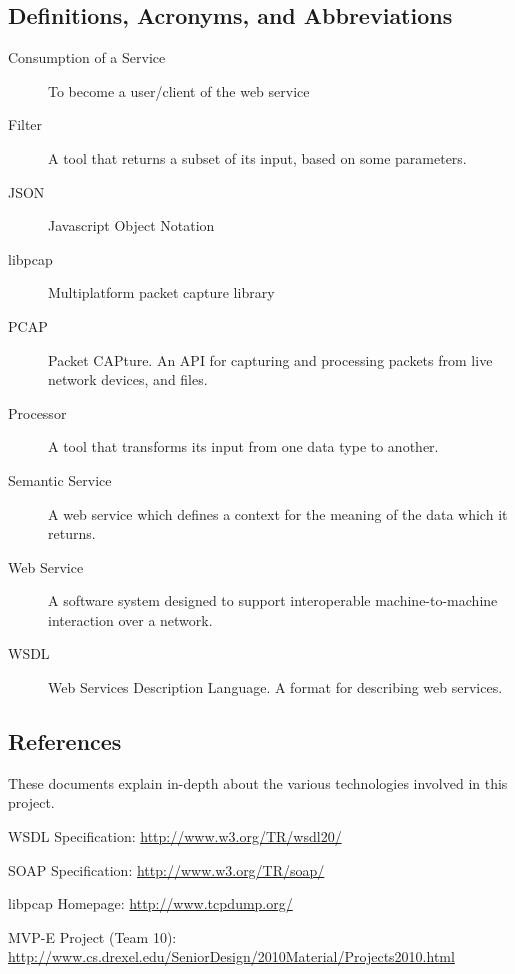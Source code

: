 \documentclass[titlepage]{article}
\begin{document}

\subsection{Definitions, Acronyms, and Abbreviations%
  \label{definitions}%
}

\begin{description}
\item[Consumption of a Service]
    To become a user/client of the web service

\item[Filter]
    A tool that returns a subset of its input, based on some parameters.

\item[JSON]
    Javascript Object Notation

\item[libpcap]
    Multiplatform packet capture library

\item[PCAP]
    Packet CAPture.  An API for capturing and processing packets from live
    network devices, and files.

\item[Processor]
    A tool that transforms its input from one data type to another.

\item[Semantic Service]
    A web service which defines a context for the meaning of the data which it
    returns.

\item[Web Service]
    A software system designed to support interoperable machine-to-machine
    interaction over a network.

\item[WSDL]
    Web Services Description Language.  A format for describing web services.
\end{description}


\subsection{References%
  \label{references}%
}

These documents explain in-depth about the various technologies involved in
this project.
%
\begin{itemize*}
\item WSDL Specification: \url{http://www.w3.org/TR/wsdl20/}
\item SOAP Specification: \url{http://www.w3.org/TR/soap/}
\item libpcap Homepage: \url{http://www.tcpdump.org/}
\item MVP-E Project (Team 10): \url{http://www.cs.drexel.edu/SeniorDesign/2010Material/Projects2010.html}
\end{itemize*}
\end{document}
